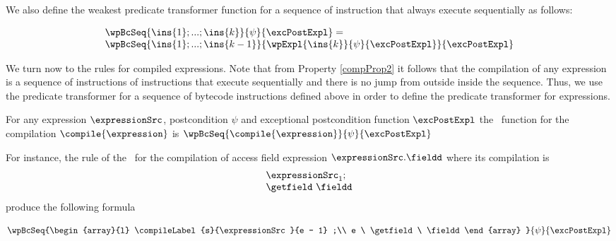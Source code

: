 We also define the weakest predicate transformer function  for a sequence of instruction that always execute sequentially as follows:

\begin{wpSeq}\label{wpSeq}
     $$ \begin{array}{l} 
              \wpBcSeq{ \ins{1};...;\ins{k}}{ \psi  } { \excPostExpl } =\\
              \wpBcSeq{\ins{1};...;\ins{k -1} }{ \wpExpl{ \ins{k} }{ \psi }{ \excPostExpl} }{\excPostExpl} 
        \end{array}$$ 

\end{wpSeq}



We turn now to the rules for compiled expressions. Note that from Property \ref{compProp2} it follows that 
the compilation of any expression is a sequence of instructions of instructions that execute sequentially and there is no jump from outside inside 
the sequence. Thus, we use 
the predicate transformer  for a sequence of bytecode instructions defined above in order to define 
the predicate transformer for  expressions. 

\begin{wpExpr} \label{wpExpr}
               For any expression $\expressionSrc$, postcondition $\psi$ and exceptional postcondition function
               $\excPostExpl$ the \wpName \ function for the compilation $\compile{\expression}$  is
               $ \wpBcSeq{\compile{\expression} }{ \psi  } { \excPostExpl }  $
 \end{wpExpr}

For instance, the  rule of the \wpName  \ for the compilation of access  field expression $\expressionSrc.\fieldd $ 
where its compilation is 
$$\begin{array}{l}
     \expressionSrc_1;\\
     \getfield \ \fieldd \\
 \end{array}
$$
  produce the following formula 

$$  \wpBcSeq{\begin{array}{l}
	              \compileLabel{s}{\expressionSrc }{e - 1} ;\\
	              e \ \getfield \ \fieldd 
	           \end{array} }{ \psi  } { \excPostExpl } $$	


